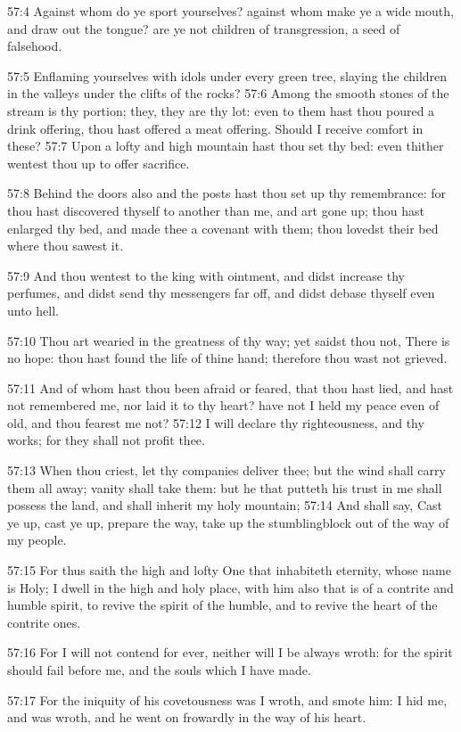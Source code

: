 57:4 Against whom do ye sport yourselves? against whom make ye a wide mouth, and draw out the tongue? are ye not children of transgression, a seed of falsehood.

57:5 Enflaming yourselves with idols under every green tree, slaying the children in the valleys under the clifts of the rocks?  57:6 Among the smooth stones of the stream is thy portion; they, they are thy lot: even to them hast thou poured a drink offering, thou hast offered a meat offering. Should I receive comfort in these?  57:7 Upon a lofty and high mountain hast thou set thy bed: even thither wentest thou up to offer sacrifice.

57:8 Behind the doors also and the posts hast thou set up thy remembrance: for thou hast discovered thyself to another than me, and art gone up; thou hast enlarged thy bed, and made thee a covenant with them; thou lovedst their bed where thou sawest it.

57:9 And thou wentest to the king with ointment, and didst increase thy perfumes, and didst send thy messengers far off, and didst debase thyself even unto hell.

57:10 Thou art wearied in the greatness of thy way; yet saidst thou not, There is no hope: thou hast found the life of thine hand; therefore thou wast not grieved.

57:11 And of whom hast thou been afraid or feared, that thou hast lied, and hast not remembered me, nor laid it to thy heart? have not I held my peace even of old, and thou fearest me not?  57:12 I will declare thy righteousness, and thy works; for they shall not profit thee.

57:13 When thou criest, let thy companies deliver thee; but the wind shall carry them all away; vanity shall take them: but he that putteth his trust in me shall possess the land, and shall inherit my holy mountain; 57:14 And shall say, Cast ye up, cast ye up, prepare the way, take up the stumblingblock out of the way of my people.

57:15 For thus saith the high and lofty One that inhabiteth eternity, whose name is Holy; I dwell in the high and holy place, with him also that is of a contrite and humble spirit, to revive the spirit of the humble, and to revive the heart of the contrite ones.

57:16 For I will not contend for ever, neither will I be always wroth: for the spirit should fail before me, and the souls which I have made.

57:17 For the iniquity of his covetousness was I wroth, and smote him: I hid me, and was wroth, and he went on frowardly in the way of his heart.

